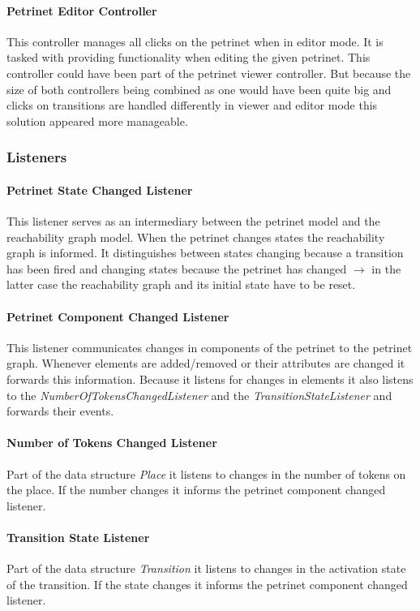 \documentclass[10pt, a4paper]{article}
\begin{document}
\paragraph{Petrinet Editor Controller} This controller manages all clicks on the petrinet when in editor mode. It is tasked with providing functionality when editing the given petrinet. This controller could have been part of the petrinet viewer controller. But because the size of both controllers being combined as one would have been quite big and clicks on transitions are handled differently in viewer and editor mode this solution appeared more manageable.

\subsubsection{Listeners}

\paragraph{Petrinet State Changed Listener} This listener serves as an intermediary between the petrinet model and the reachability graph model. When the petrinet changes states the reachability graph is informed. It distinguishes between states changing because a transition has been fired and changing states because the petrinet has changed $\rightarrow$ in the latter case the reachability graph and its initial state have to be reset.
\paragraph{Petrinet Component Changed Listener} This listener communicates changes in components of the petrinet to the petrinet graph. Whenever elements are added/removed or their attributes are changed it forwards this information.  Because it listens for changes in elements it also listens to the \textit{NumberOfTokensChangedListener} and the \textit{TransitionStateListener} and forwards their events.
\paragraph{Number of Tokens Changed Listener} Part of the data structure \textit{Place} it listens to changes in the number of tokens on the place. If the number changes it informs the petrinet component changed listener. 
\paragraph{Transition State Listener} Part of the data structure \textit{Transition} it listens to changes in the activation state of the transition. If the state changes it informs the petrinet component changed listener.
\end{document}
